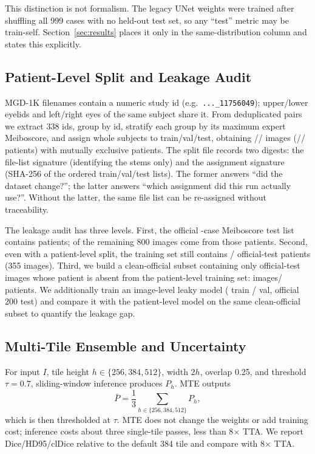 This distinction is not formalism. The legacy UNet weights were trained after shuffling all 999 cases with no held-out test set, so any ``test'' metric may be train-self. Section~\ref{sec:results} places it only in the same-distribution column and states this explicitly.

\subsection{Patient-Level Split and Leakage Audit}\label{sec:patient-split}

MGD-1K filenames contain a numeric study id (e.g.\ \texttt{...\_11756049}); upper/lower eyelids and left/right eyes of the same subject share it. From \nTotal{} deduplicated pairs we extract 338 ids, group by id, stratify each group by its maximum expert Meiboscore, and assign whole subjects to train/val/test, obtaining \nTrain/\nVal/\nTest{} images (\nTrainPatients/\nValPatients/\nTestPatients{} patients) with mutually exclusive patients. The split file records two digests: the file-list signature \splitSig{} (identifying the \nTotal{} stems only) and the assignment signature \assignmentSig{} (SHA-256 of the ordered train/val/test lists). The former answers ``did the dataset change?''; the latter answers ``which assignment did this run actually use?''. Without the latter, the same file list can be re-assigned without traceability.

The leakage audit has three levels. First, the official \officialTestImages-case Meiboscore test list contains \officialTestPatients{} patients; \officialLeakImages{} of the remaining 800 images come from those patients. Second, even with a patient-level split, the \nTrain{} training set still contains \officialLeakPatients/\officialTestPatients{} official-test patients (355 images). Third, we build a clean-official subset containing only official-test images whose patient is absent from the patient-level training set: \cleanOfficialImages{} images/\cleanOfficialPatients{} patients. We additionally train an image-level leaky model (\leakyTrainImages{} train / \leakyValImages{} val, official 200 test) and compare it with the patient-level model on the same clean-official subset to quantify the leakage gap.

\subsection{Multi-Tile Ensemble and Uncertainty}\label{sec:mte}

For input $I$, tile height $h\in\{256,384,512\}$, width $2h$, overlap 0.25, and threshold $\tau=0.7$, sliding-window inference produces $P_h$. MTE outputs
\begin{equation}
\bar P=\frac{1}{3}\sum_{h\in\{256,384,512\}}P_h,
\end{equation}
which is then thresholded at $\tau$. MTE does not change the weights or add training cost; inference costs about three single-tile passes, less than 8$\times$ TTA. We report Dice/HD95/clDice relative to the default 384 tile and compare with 8$\times$ TTA.

